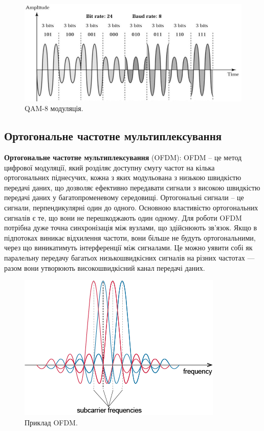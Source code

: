 \documentclass{article}
\begin{document}
\begin{figure}[h!]
	\centering
	\includegraphics[width=0.7\linewidth]{images/qam.png}
	\caption{\label{fig:qam} QAM-8 модуляція.}
\end{figure}

\newpage
\subsection{Ортогональне частотне мультиплексування}
\textbf{Ортогональне частотне мультиплексування} (OFDM): OFDM – це метод цифрової модуляції, який розділяє доступну смугу частот на кілька ортогональних піднесучих, кожна з яких модульована з низькою швидкістю передачі даних, що дозволяє ефективно передавати сигнали з високою швидкістю передачі даних у багатопроменевому середовищі.
Ортогональні сигнали – це сигнали, перпендикулярні один до одного. Основною властивістю ортогональних сигналів є те, що вони не перешкоджають один одному. Для роботи OFDM потрібна дуже точна синхронізація між вузлами, що здійснюють зв'язок. Якщо в підпотоках виникає відхилення частоти, вони більше не будуть ортогональними, через що виникатимуть інтерференції між сигналами. Це можно уявити собі як паралельну передачу багатьох низькошвидкісних сигналів на різних частотах — разом вони утворюють високошвидкісний канал передачі даних.

\begin{figure}[h!]
	\centering
	\includegraphics[width=0.7\linewidth]{images/ofdm.png}
	\caption{\label{fig:ofdm}  Приклад OFDM.}
\end{figure}
\end{document}

